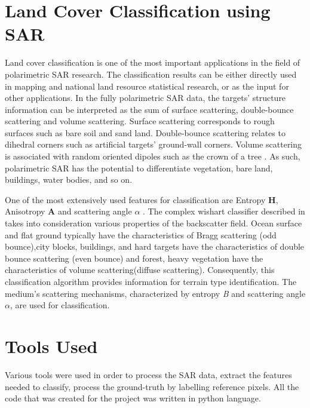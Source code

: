 \section{Land Cover Classification using SAR}

Land cover classification is one of the most important applications in the field of polarimetric SAR research. The classification results can be either directly used in mapping and national land resource statistical research, or as the input for other applications. In the fully polarimetric SAR data, the targets’ structure information can be interpreted as the sum of surface scattering, double-bounce scattering and volume scattering. Surface scattering corresponds to rough surfaces such as bare soil and sand land. Double-bounce scattering relates to dihedral corners such as artificial targets’ ground-wall corners. Volume scattering is associated with random oriented dipoles such as the crown of a tree \cite{fang2018land}. As such, polarimetric SAR has the potential to differentiate vegetation, bare land, buildings, water bodies, and so on.

One of the most extensively used features for classification are Entropy \textbf{H},  Anisotropy \textbf{A} and scattering angle $\alpha$ \cite{lee2009polarimetric}. The complex wishart classifier described in \cite{lee2009polarimetric} takes into consideration various properties of the backscatter field. Ocean surface and flat ground typically have the characteristics of Bragg scattering (odd bounce),city
blocks, buildings, and hard targets have the characteristics of double bounce scattering (even bounce) and forest, heavy vegetation have the characteristics of volume scattering(diffuse scattering). Consequently, this classification algorithm provides information for terrain type identification. The medium’s scattering mechanisms, characterized by entropy \textit{B} and scattering angle $\alpha$, are used for classification.


\section{Tools Used}

Various tools were used in order to process the SAR data, extract the features needed to classify, process the ground-truth by labelling reference pixels. All the code that was created for the project was written in python language. 
